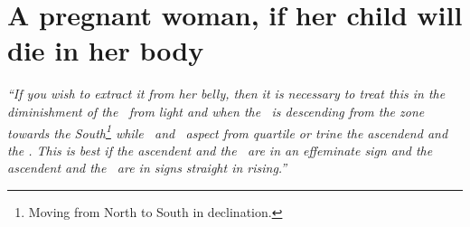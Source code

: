 \section{A pregnant woman, if her child will die in her body}
\textsl{``If you wish to extract it from her belly, then it is necessary to treat this in the diminishment of the \Moon\, from light and when the \Moon\, is descending from the zone towards the South\footnote{Moving from North to South in declination.} while \Mars\, and \Venus\, aspect from quartile or trine the ascendend and the \Moon. This is best if the ascendent and the \Moon\, are in an effeminate sign and the ascendent and the \Moon\, are in signs straight in rising.''}